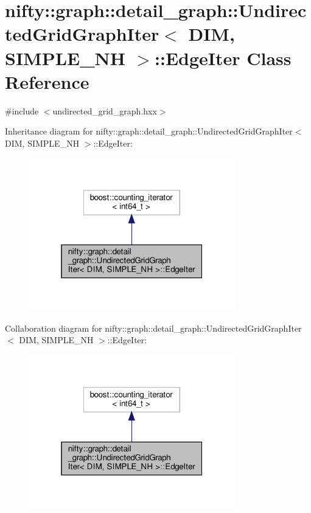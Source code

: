 \hypertarget{classnifty_1_1graph_1_1detail__graph_1_1UndirectedGridGraphIter_1_1EdgeIter}{}\section{nifty\+:\+:graph\+:\+:detail\+\_\+graph\+:\+:Undirected\+Grid\+Graph\+Iter$<$ D\+IM, S\+I\+M\+P\+L\+E\+\_\+\+NH $>$\+:\+:Edge\+Iter Class Reference}
\label{classnifty_1_1graph_1_1detail__graph_1_1UndirectedGridGraphIter_1_1EdgeIter}


{\ttfamily \#include $<$undirected\+\_\+grid\+\_\+graph.\+hxx$>$}



Inheritance diagram for nifty\+:\+:graph\+:\+:detail\+\_\+graph\+:\+:Undirected\+Grid\+Graph\+Iter$<$ D\+IM, S\+I\+M\+P\+L\+E\+\_\+\+NH $>$\+:\+:Edge\+Iter\+:
\nopagebreak
\begin{figure}[H]
\begin{center}
\leavevmode
\includegraphics[width=253pt]{classnifty_1_1graph_1_1detail__graph_1_1UndirectedGridGraphIter_1_1EdgeIter__inherit__graph}
\end{center}
\end{figure}


Collaboration diagram for nifty\+:\+:graph\+:\+:detail\+\_\+graph\+:\+:Undirected\+Grid\+Graph\+Iter$<$ D\+IM, S\+I\+M\+P\+L\+E\+\_\+\+NH $>$\+:\+:Edge\+Iter\+:
\nopagebreak
\begin{figure}[H]
\begin{center}
\leavevmode
\includegraphics[width=253pt]{classnifty_1_1graph_1_1detail__graph_1_1UndirectedGridGraphIter_1_1EdgeIter__coll__graph}
\end{center}
\end{figure}


